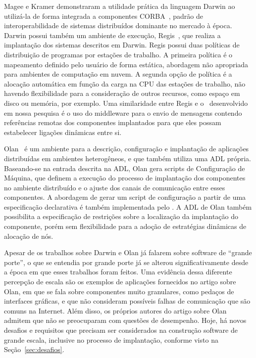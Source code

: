 Magee e Kramer demonstraram a utilidade prática da linguagem Darwin ao utilizá-la de forma integrada a componentes CORBA~\cite{Magee1997Corba}, padrão de interoperabilidade de sistemas distribuídos dominante no mercado à época. Darwin possui também um ambiente de execução, Regis~\cite{Magee1994Regis}, que realiza a implantação dos sistemas descritos em Darwin. Regis possui duas políticas de distribuição de programas por estações de trabalho. A primeira política é o mapeamento definido pelo usuário de forma estática, abordagem não apropriada para ambientes de computação em nuvem. A segunda opção de política é a alocação automática em função da carga na CPU das estações de trabalho, não havendo flexibilidade para a consideração de outros recursos, como espaço em disco ou memória, por exemplo. Uma similaridade entre Regis e o \ee\ desenvolvido em nossa pesquisa é o uso do middleware para o envio de mensagens contendo referências remotas dos componentes implantados para que eles possam estabelecer ligações dinâmicas entre si.

Olan~\cite{Balter1998Olan} é um ambiente para a descrição, configuração e implantação de aplicações distribuídas em ambientes heterogêneos, e que também utiliza uma ADL própria. Baseando-se na entrada descrita na ADL, Olan gera scripts de Configuração de Máquina, que definem a execução do processo de implantação dos componentes no ambiente distribuído e o ajuste dos canais de comunicação entre esses componentes. A abordagem de gerar um script de configuração a partir de uma especificação declarativa é também implementada pelo \ee. A ADL de Olan também possibilita a especificação de restrições sobre a localização da implantação do componente, porém sem flexibilidade para a adoção de estratégias dinâmicas de alocação de nós.

Apesar de os trabalhos sobre Darwin e Olan já falarem sobre software de ``grande porte'', o que se entendia por grande porte já se alterou significativamente desde a época em que esses trabalhos foram feitos. Uma evidência dessa diferente percepção de escala são os exemplos de aplicações fornecidos no artigo sobre Olan, em que se fala sobre componentes muito granulares, como pedaços de interfaces gráficas, e que não consideram possíveis falhas de comunicação que são comuns na Internet. Além disso, os próprios autores do artigo sobre Olan admitem que não se preocuparam com questões de desempenho. 
Hoje, há novos  desafios e requisitos que precisam ser considerados na construção software de grande escala, inclusive no processo de implantação, conforme visto na Seção~\ref{sec:desafios}.

